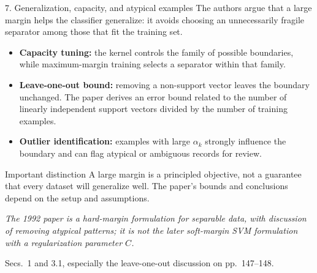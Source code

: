 \documentclass[10pt,compress]{beamer}
\newcommand{\defline}[1]{{\footnotesize\textcolor{aggiemaroon}{\textit{#1}}\par}}
\begin{document}
\begin{frame}{7. Generalization, capacity, and atypical examples}\footnotesize
The authors argue that a large margin helps the classifier generalize: it avoids choosing an unnecessarily fragile separator among those that fit the training set.
\begin{itemize}\small
\item \textbf{Capacity tuning:} the kernel controls the family of possible boundaries, while maximum-margin training selects a separator within that family.
\item \textbf{Leave-one-out bound:} removing a non-support vector leaves the boundary unchanged. The paper derives an error bound related to the number of linearly independent support vectors divided by the number of training examples.
\item \textbf{Outlier identification:} examples with large $\alpha_k$ strongly influence the boundary and can flag atypical or ambiguous records for review.
\end{itemize}
\begin{block}{Important distinction}
\small A large margin is a principled objective, not a guarantee that every dataset will generalize well. The paper's bounds and conclusions depend on the setup and assumptions.
\end{block}
\defline{The 1992 paper is a hard-margin formulation for separable data, with discussion of removing atypical patterns; it is not the later soft-margin SVM formulation with a regularization parameter $C$.}
{\scriptsize Secs.~1 and 3.1, especially the leave-one-out discussion on pp.~147--148.}
\end{frame}

\end{document}

